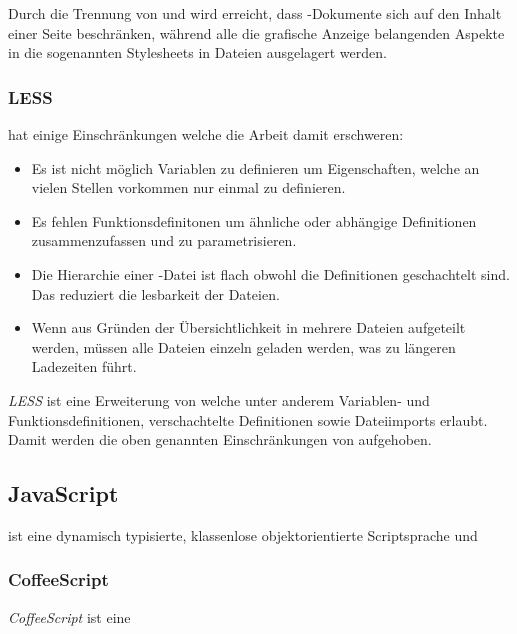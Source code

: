 Durch die Trennung von  und  wird erreicht, dass -Dokumente sich auf
den Inhalt einer Seite beschränken, während alle die grafische Anzeige  belangenden Aspekte in die
sogenannten Stylesheets in  Dateien ausgelagert  werden.


\subsubsection{LESS}

 hat einige Einschränkungen welche die Arbeit damit erschweren:

\begin{itemize} 
  \item Es ist nicht möglich Variablen zu definieren um Eigenschaften, welche an
vielen Stellen vorkommen nur einmal zu definieren. 
  \item Es fehlen Funktionsdefinitonen um ähnliche
oder abhängige Definitionen  zusammenzufassen und zu parametrisieren. 
  \item Die Hierarchie einer
-Datei ist flach obwohl die Definitionen geschachtelt sind. Das reduziert die lesbarkeit
der Dateien. 
  \item Wenn aus Gründen der Übersichtlichkeit  in mehrere Dateien aufgeteilt
werden, müssen alle Dateien einzeln geladen werden, was zu längeren Ladezeiten führt. \end{itemize}

\textit{LESS} ist eine Erweiterung von  welche unter anderem  Variablen- und
Funktionsdefinitionen, verschachtelte Definitionen sowie  Dateiimports erlaubt. Damit werden die
oben genannten Einschränkungen von  aufgehoben.


\subsection{JavaScript}

 ist eine dynamisch typisierte, klassenlose objektorientierte  Scriptsprache und

\subsubsection{CoffeeScript}

\textit{CoffeeScript} ist eine 

